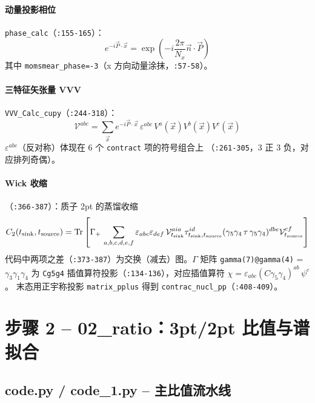\documentclass[UTF8]{ctexart}
\begin{document}
\paragraph{动量投影相位} \texttt{phase\_calc}（\texttt{:155-165}）：
\begin{equation}
  e^{-i\vec P\cdot\vec x} = \exp\!\left(-i\frac{2\pi}{N_x}\vec n\cdot\vec P\right)
\end{equation}
其中 \texttt{momsmear\_phase=-3}（x 方向动量涂抹，\texttt{:57-58}）。

\paragraph{三特征矢张量 VVV} \texttt{VVV\_Calc\_cupy}（\texttt{:244-318}）：
\begin{equation}
  \mathcal{V}^{abc} = \sum_{\vec x} e^{-i\vec P\cdot\vec x}\,
  \varepsilon^{abc}\,V^a(\vec x)V^b(\vec x)V^c(\vec x)
\end{equation}
$\varepsilon^{abc}$（反对称）体现在 6 个 \texttt{contract} 项的符号组合上
（\texttt{:261-305}，3 正 3 负，对应排列奇偶）。

\paragraph{Wick 收缩}（\texttt{:366-387}）：质子 2pt 的蒸馏收缩
\begin{equation}
  C_{2}(t_{\rm sink},t_{\rm source}) = \mathrm{Tr}\left[\Gamma_+\,
  \sum_{a,b,c,d,e,f}\varepsilon_{abc}\varepsilon_{def}\,
  \mathcal{V}^{aia}_{t_{\rm sink}}\tau^{id}_{t_{\rm sink},t_{\rm source}}
  (\gamma_5\gamma_4\,\tau\,\gamma_5\gamma_4)^{dbe}\mathcal{V}^{cf}_{t_{\rm source}}\right]
\end{equation}
代码中两项之差（\texttt{:373-387}）为交换（减去）图。$\Gamma$ 矩阵
\texttt{gamma(7)@gamma(4)} = $\gamma_3\gamma_1\gamma_4$ 为 \texttt{Cg5g4}
插值算符投影（\texttt{:134-136}），对应插值算符
$\chi = \varepsilon_{abc}(C\gamma_5\gamma_4)^{a b}\,\psi^c$。
末态用正宇称投影 \texttt{matrix\_pplus} 得到
\texttt{contrac\_nucl\_pp}（\texttt{:408-409}）。

\section{步骤 2 -- 02\_ratio：3pt/2pt 比值与谱拟合}

\subsection{code.py / code\_1.py -- 主比值流水线}
\end{document}
